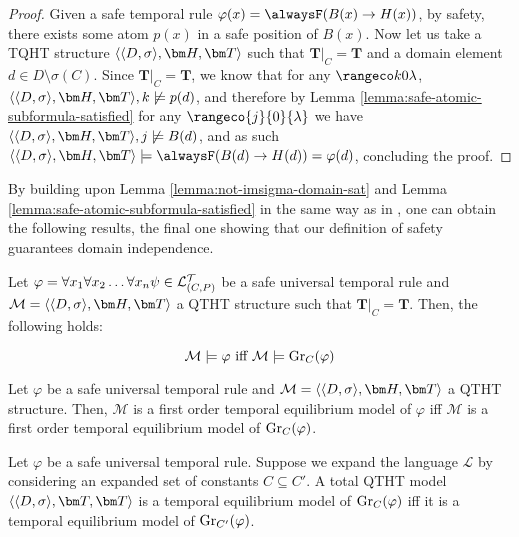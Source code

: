\begin{proof}
  Given a safe temporal rule
  $\varphi(x) = \alwaysF(B(x) \rightarrow H(x))$, by safety, there
  exists some atom $p(x)$ in a safe position of $B(x)$. Now let us
  take a TQHT structure $\qthandt$ such that $\bm{T}\vert_{C}=\bm{T}$
  and a domain element $d \in D \setminus \sigma(C)$. Since
  $\bm{T}\vert_{C}=\bm{T}$, we know that for any $\kinlambda$,
  $\qthandt, k \not \models p(d)$, and therefore by Lemma
  \ref{lemma:safe-atomic-subformula-satisfied} for any
  $\rangeco{j}{0}{\lambda}$ we have $\qthandt,j \not \models B(d)$,
  and as such
  $\qthandt \models \alwaysF(B(d) \rightarrow H(d)) = \varphi(d)$,
  concluding the proof.
\end{proof}

By building upon Lemma \ref{lemma:not-imsigma-domain-sat} and Lemma
\ref{lemma:safe-atomic-subformula-satisfied} in the same way as in
\cite{agcapevidi17a}, one can obtain the following results, the final
one showing that our definition of safety guarantees domain independence.

\begin{proposition}\label{prop:sat-iff-sat-groundc}
  Let $\varphi = \forall x_1 \forall x_2 \dots \forall x_n \psi \in \mathcal{L}_{(C,P)}^\mathcal{T}$ be a safe universal temporal rule and \\
  $\mathcal{M} = \qthandt$ a QTHT structure such that
  $\bm{T}\vert_{C}=\bm{T}$. Then, the following holds:

  \begin{equation*}
    \mathcal{M} \models \varphi \text{ iff } \mathcal{M} \models \operatorname{Gr}_{C}(\varphi)
  \end{equation*}
\end{proposition}

\begin{proposition}\label{prop:equil-iff-equil-groundc}
  Let $\varphi$ be a safe universal temporal rule and
  $\mathcal{M} = \qthandt$ a QTHT structure. Then, $\mathcal{M}$ is a
  first order temporal equilibrium model of $\varphi$ iff
  $\mathcal{M}$ is a first order temporal equilibrium model of
  $\operatorname{Gr}_{C}(\varphi)$.
\end{proposition}

\begin{theorem}\label{theorem:domain-independence}
  Let $\varphi$ be a safe universal temporal rule. Suppose we expand
  the language $\mathcal{L}$ by considering an expanded set of
  constants $C \subseteq C'$. A total QTHT model $\qttandt$ is a
  temporal equilibrium model of $\operatorname{Gr}_{C}(\varphi)$ iff it is a
  temporal equilibrium model of $\operatorname{Gr}_{C'}(\varphi)$.
\end{theorem}

